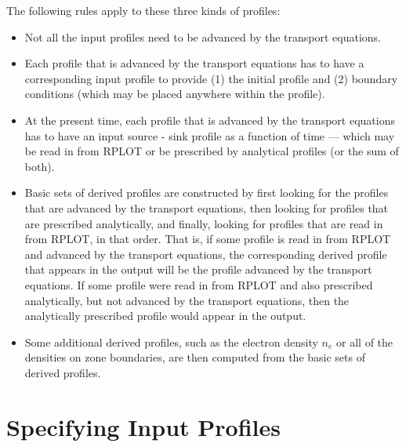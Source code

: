 The following rules apply to these three kinds of profiles:
\begin{itemize}
\item  Not all the input profiles need to be advanced by the transport
equations.
\item  Each profile that is advanced by the transport equations has to
have a corresponding input profile to provide
(1)  the initial profile and
(2)  boundary conditions (which may be placed anywhere within the
profile).
\item  At the present time, each profile that is advanced by the
transport equations has to have an input source - sink profile as a
function of time --- which may be read in from RPLOT or be prescribed by
analytical profiles (or the sum of both).
\item  Basic sets of derived profiles are constructed by first looking
for the profiles that are advanced by the transport equations, then
looking for profiles that are prescribed analytically, and finally,
looking for profiles that are read in from RPLOT, in that order.
That is, if some profile is read in from RPLOT and advanced by the
transport equations, the corresponding derived profile that appears in
the output will be the profile advanced by the transport equations.
If some profile were read in from RPLOT and also prescribed
analytically, but not advanced by the transport equations, then the
analytically prescribed profile would appear in the output.
\item  Some additional derived profiles, such as the electron density
$ n_e $ or all of the densities on zone boundaries, are then computed
from the basic sets of derived profiles.

\end{itemize}


\section{Specifying Input Profiles}

